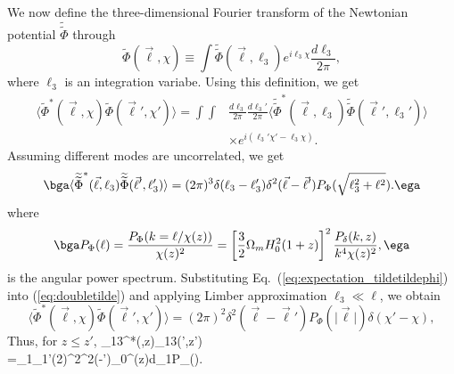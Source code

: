 We now define the three-dimensional Fourier transform of the Newtonian potential $\widetilde{\widetilde\Phi}$ through
\begin{equation}
\widetilde{\Phi}(\vec{\ell},\chi)\equiv\int\widetilde{\widetilde{\Phi}}(\vec{\ell},\ell_3)e^{i\ell_3\chi}\frac{d\ell_3}{2\pi},
\end{equation}
where $\ell_3$ is an integration variabe. Using this definition, we get
\begin{align}
\langle\widetilde{\Phi}^*(\vec{\ell},\chi)\widetilde{\Phi}(\vec{\ell}',\chi')\rangle=\int\int&\frac{d\ell_3}{2\pi}\frac{d\ell_3'}{2\pi}\langle\widetilde{\widetilde{\Phi}}^*(\vec{\ell},\ell_3)\widetilde{\widetilde{\Phi}}(\vec{\ell}',\ell_3')\rangle\nonumber\\
&\times e^{i(\ell_3'\chi'-\ell_3\chi)}. \label{eq:doubletilde}
\end{align}
Assuming different modes are uncorrelated, we get
\begin{equation}
\bga
\langle\widetilde{\widetilde{\Phi}}^*(\vec{\ell},\ell_3)\widetilde{\widetilde{\Phi}}(\vec{\ell}',\ell_3')\rangle\\
=(2\pi)^3\delta(\ell_3-\ell_3')\delta^2(\vec{\ell}-\vec{\ell}')P_{\Phi}(\sqrt{\ell_3^2+\ell^2}).
\ega
\label{eq:expectation_tildetildephi}
\end{equation}
where
\begin{equation}
\bga
P_{\Phi}(\ell)=\frac{P_{\Phi}(k=\ell/\chi(z))}{\chi(z)^2}\\
=\left[\frac{3}{2}\Omega_mH_0^2(1+z)\right]^2\frac{P_{\delta}(k,z)}{k^4\chi(z)^2},
\ega
\end{equation}
is the angular power spectrum.
Substituting Eq.~(\ref{eq:expectation_tildetildephi}) into (\ref{eq:doubletilde}) and applying Limber approximation $\ell_3\ll\ell$, we obtain
\begin{equation}
\langle\widetilde{\Phi}^*(\vec{\ell},\chi)\widetilde{\Phi}(\vec{\ell}',\chi')\rangle=(2\pi)^2\delta^2(\vec{\ell}-\vec{\ell}')P_{\Phi}(\vert\vec{\ell}\vert)\delta(\chi'-\chi),
\end{equation}
Thus, for $z\leq z'$,
\beq
\bga
\langle\widetilde{\gamma}_{13}^*(\vec{\ell},z)\widetilde{\gamma}_{13}(\vec{\ell}',z')\rangle\\
=\ell_1\ell_1'(2\pi)^2\delta^2(\vec{\ell}-\vec{\ell}')\int_0^{\chi(z)}d\chi_1P_{\Phi}(\ell).
\ega
\label{eq:exp_gamma13}
\eeq

